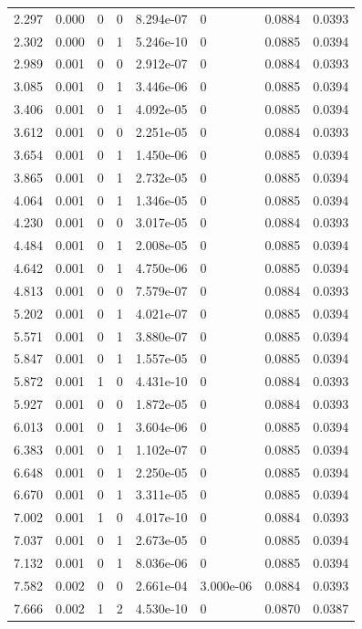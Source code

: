 \documentclass[preview]{standalone}
\begin{document}
{{\begin{tabular}{L{1.2cm}C{1.2cm} C{0.3cm}C{0.5cm} C{1.4cm}C{1.4cm} C{1.4cm}C{1.4cm}}
  2.297  &  0.000  & 0     &  0 &  8.294e-07  & 0  & 0.0884 &  0.0393   \\ 
  2.302  &  0.000  & 0     &  1 &  5.246e-10  & 0  & 0.0885 &  0.0394   \\ 
  2.989  &  0.001  & 0     &  0 &  2.912e-07  & 0  & 0.0884 &  0.0393   \\ 
  3.085  &  0.001  & 0     &  1 &  3.446e-06  & 0  & 0.0885 &  0.0394   \\ 
  3.406  &  0.001  & 0     &  1 &  4.092e-05  & 0  & 0.0885 &  0.0394   \\ 
  3.612  &  0.001  & 0     &  0 &  2.251e-05  & 0  & 0.0884 &  0.0393   \\ 
  3.654  &  0.001  & 0     &  1 &  1.450e-06  & 0  & 0.0885 &  0.0394   \\ 
  3.865  &  0.001  & 0     &  1 &  2.732e-05  & 0  & 0.0885 &  0.0394   \\ 
  4.064  &  0.001  & 0     &  1 &  1.346e-05  & 0  & 0.0885 &  0.0394   \\ 
  4.230  &  0.001  & 0     &  0 &  3.017e-05  & 0  & 0.0884 &  0.0393   \\ 
  4.484  &  0.001  & 0     &  1 &  2.008e-05  & 0  & 0.0885 &  0.0394   \\ 
  4.642  &  0.001  & 0     &  1 &  4.750e-06  & 0  & 0.0885 &  0.0394   \\ 
  4.813  &  0.001  & 0     &  0 &  7.579e-07  & 0  & 0.0884 &  0.0393   \\ 
  5.202  &  0.001  & 0     &  1 &  4.021e-07  & 0  & 0.0885 &  0.0394   \\ 
  5.571  &  0.001  & 0     &  1 &  3.880e-07  & 0  & 0.0885 &  0.0394   \\ 
  5.847  &  0.001  & 0     &  1 &  1.557e-05  & 0  & 0.0885 &  0.0394   \\ 
  5.872  &  0.001  & 1     &  0 &  4.431e-10  & 0  & 0.0884 &  0.0393   \\ 
  5.927  &  0.001  & 0     &  0 &  1.872e-05  & 0  & 0.0884 &  0.0393   \\ 
  6.013  &  0.001  & 0     &  1 &  3.604e-06  & 0  & 0.0885 &  0.0394   \\ 
  6.383  &  0.001  & 0     &  1 &  1.102e-07  & 0  & 0.0885 &  0.0394   \\ 
  6.648  &  0.001  & 0     &  1 &  2.250e-05  & 0  & 0.0885 &  0.0394   \\ 
  6.670  &  0.001  & 0     &  1 &  3.311e-05  & 0  & 0.0885 &  0.0394   \\ 
  7.002  &  0.001  & 1     &  0 &  4.017e-10  & 0  & 0.0884 &  0.0393   \\ 
  7.037  &  0.001  & 0     &  1 &  2.673e-05  & 0  & 0.0885 &  0.0394   \\ 
  7.132  &  0.001  & 0     &  1 &  8.036e-06  & 0  & 0.0885 &  0.0394   \\ 
  7.582  &  0.002  & 0     &  0 &  2.661e-04  & 3.000e-06  & 0.0884 &  0.0393   \\ 
  7.666  &  0.002  & 1     &  2 &  4.530e-10  & 0  & 0.0870 &  0.0387   \\ 
\hline 
\end{tabular} 

}}
\end{document}

